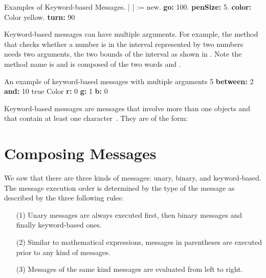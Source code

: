 \begin{scriptwithtitle}{Examples of Keyword-based Messages.}\label{scr:keyword}
| \caro |
\caro := \Turtle new.
\caro \textbf{go:} 100.
\caro \textbf{penSize:} 5.
\caro \textbf{color:} Color yellow.
\caro \textbf{turn:} 90
\end{scriptwithtitle}

Keyword-based messages can have multiple arguments. For example, the method  that checks whether a number is in the interval represented by two numbers needs two arguments, the two bounds of the interval as shown in . Note the method name is  and is composed of the two words  and . 

\begin{scriptwithtitle}{An example of keyword-based messages with multiple arguments}\label{scr:keyword2}
5 \textbf{between:} 2 \textbf{and:} 10
\pr true
Color \textbf{r:} 0 \textbf{g:} 1 \textbf{b:} 0
\end{scriptwithtitle}

\begin{largecadre}
{Keyword-based messages are messages that involve more than one objects and that contain at least one character~\ct{:}. They are of the form: }
\end{largecadre}

\section{Composing Messages}\label{sec:composing}

We saw that there are  three kinds of messages: unary, binary, and keyword-based. 
The message execution order is determined by the type of the message as  described by the three following rules:

\begin{itemize}
\item[(1)] Unary messages are always executed first, then binary messages and finally keyword-based ones. 
\item[(2)] Similar to  mathematical expressions, messages in parentheses are executed prior to any kind of messages. 
\item[(3)] Messages of the same kind messages are evaluated from left to right. 
\end{itemize}

